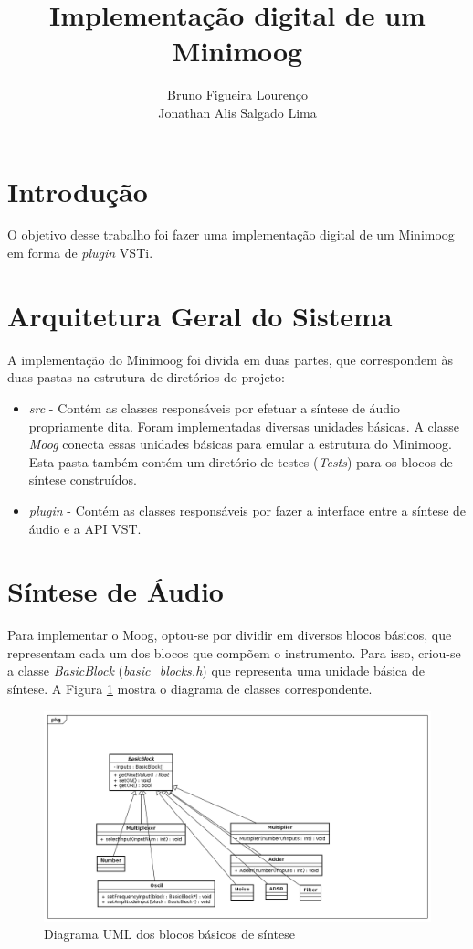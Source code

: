 \documentclass{article}
\title{Implementação digital de um Minimoog}
\author{Bruno Figueira Lourenço \\ Jonathan Alis Salgado Lima}
\begin{document}
\maketitle

\section{Introdução}
O objetivo desse trabalho foi fazer uma implementação digital de um Minimoog em forma de \emph{plugin} VSTi.



\section{Arquitetura Geral do Sistema}
A implementação do Minimoog foi divida em duas partes, que correspondem às 
duas pastas na estrutura de diretórios do projeto:

\begin{itemize}
	\item \emph{src} - Contém as classes responsáveis por efetuar 
	a síntese de áudio propriamente dita. Foram implementadas diversas 
	unidades básicas. A classe \emph{Moog} conecta essas unidades básicas para 
	emular a estrutura do Minimoog. Esta pasta também contém um diretório 
	de testes (\emph{Tests}) para os blocos de síntese construídos.
	\item \emph{plugin} - Contém as classes responsáveis por fazer a 
	interface entre a síntese de áudio e a API VST.
\end{itemize}

\section{Síntese de Áudio}
Para implementar o Moog, optou-se por dividir em diversos blocos básicos, 
que representam cada um dos blocos que compõem o instrumento. Para isso, 
criou-se a classe \emph{BasicBlock} (\emph{basic\_blocks.h}) que representa 
uma unidade básica de síntese. A Figura \ref{fig:uml1} mostra o diagrama 
de classes correspondente.

\begin{figure}
\centering
\includegraphics[scale=0.4]{Classes.png}\caption{Diagrama UML dos blocos básicos de síntese}\label{fig:uml1}
\end{figure}
\end{document}
